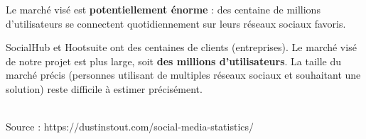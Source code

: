 \documentclass[11pt]{article}
\begin{document}

Le marché visé est \textbf{potentiellement énorme} : des  centaine de millions d'utilisateurs se connectent quotidiennement sur leurs réseaux sociaux favoris. 

SocialHub et Hootsuite ont des centaines de clients (entreprises). Le marché visé de notre projet est plus large, soit \textbf{des millions d’utilisateurs}. La taille du marché précis (personnes utilisant de multiples réseaux sociaux et souhaitant une solution) reste difficile à estimer précisément.

\vspace{4mm}
\begin{center}
	\vspace{2mm}\\
	Source : https://dustinstout.com/social-media-statistics/
\end{center}
\end{document}
